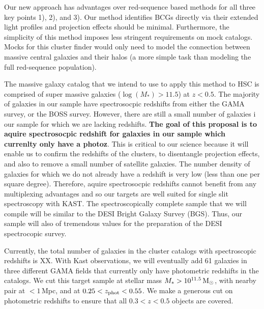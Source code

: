 \documentclass[letterpaper,12pt,dvips]{article}
\begin{document}
Our new approach has advantages over red-sequence based methods for all three key points 1), 2), and 3). Our method identifies BCGs directly via their extended light profiles and projection effects should be minimal. Furthermore, the simplicity of this method imposes less stringent requirements on mock catalogs. Mocks for this cluster finder would only need to model the connection between massive central galaxies and their halos (a more simple task than modeling the full red-sequence population).

The massive galaxy catalog that we intend to use to apply this method to HSC is comprised of super massive galaxies ($\log(M_*)>11.5$) at $z<0.5$. The majority of galaxies in our sample have spectrosocpic redshifts from either the GAMA survey, or the BOSS survey. However, there are still a small number of galaxies i our sample for which we are lacking redshifts. \textbf{The goal of this proposal is to aquire spectrosocpic redshift for galaxies in our sample which currenlty only have a photoz}. This is critical to our science because it will enable us to confirm the redshifts of the clusters, to disentangle projection effects, and also to remove a small number of satellite galaxies. The number density of galaxies for which we do not already have a redshift is very low (less than one per square degree). Therefore, aquire spectrosocpic redshifts cannot benefit from any multiplexing advantages and so our targets are well suited for single slit spectroscopy with KAST. The spectroscopically complete sample that we will compile will be similar to the DESI Bright Galaxy Survey (BGS). Thus, our sample will also of tremendous values for the preparation of the DESI spectrocopic survey.


Currently, the total number of galaxies in the cluster catalogs with spectroscopic redshifts is 
XX. With Kast observations, we will eventually add 61 galaxies in three different GAMA fields that 
currently only have photometric redshifts in the catalogs. We cut this target sample at stellar 
mass $M_*>10^{11.5}\,{\rm M}_\odot$, with nearby pair at $<1$\,Mpc, and at 
$0.25<z_{\rm phot}<0.55$. We make a generous cut on photometric redshifts to ensure that all 
$0.3 < z < 0.5$ objects are covered. 
\end{document}
